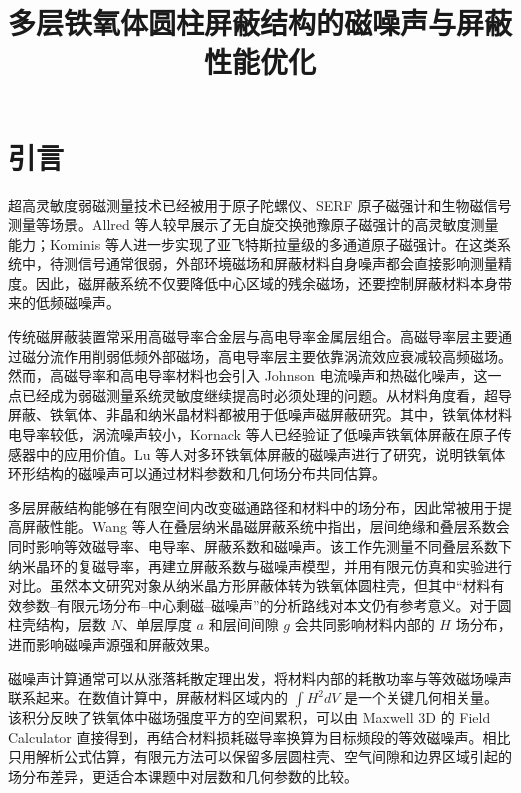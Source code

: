 \documentclass[UTF8,a4paper,12pt]{ctexart}
\title{多层铁氧体圆柱屏蔽结构的磁噪声与屏蔽性能优化}
\author{}
\date{}
\begin{document}
\maketitle

\section{引言}

超高灵敏度弱磁测量技术已经被用于原子陀螺仪、SERF 原子磁强计和生物磁信号测量等场景。Allred 等人较早展示了无自旋交换弛豫原子磁强计的高灵敏度测量能力\cite{Allred2002SERF}；Kominis 等人进一步实现了亚飞特斯拉量级的多通道原子磁强计\cite{Kominis2003Subfemtotesla}。在这类系统中，待测信号通常很弱，外部环境磁场和屏蔽材料自身噪声都会直接影响测量精度。因此，磁屏蔽系统不仅要降低中心区域的残余磁场，还要控制屏蔽材料本身带来的低频磁噪声。

传统磁屏蔽装置常采用高磁导率合金层与高电导率金属层组合。高磁导率层主要通过磁分流作用削弱低频外部磁场，高电导率层主要依靠涡流效应衰减较高频磁场。然而，高磁导率和高电导率材料也会引入 Johnson 电流噪声和热磁化噪声，这一点已经成为弱磁测量系统灵敏度继续提高时必须处理的问题\cite{LeeRomalis2008Noise,Wang2024Nanocrystalline}。从材料角度看，超导屏蔽、铁氧体、非晶和纳米晶材料都被用于低噪声磁屏蔽研究。其中，铁氧体材料电导率较低，涡流噪声较小，Kornack 等人已经验证了低噪声铁氧体屏蔽在原子传感器中的应用价值\cite{Kornack2007Ferrite}。Lu 等人对多环铁氧体屏蔽的磁噪声进行了研究，说明铁氧体环形结构的磁噪声可以通过材料参数和几何场分布共同估算\cite{Lu2020FerriteNoise}。

多层屏蔽结构能够在有限空间内改变磁通路径和材料中的场分布，因此常被用于提高屏蔽性能。Wang 等人在叠层纳米晶磁屏蔽系统中指出，层间绝缘和叠层系数会同时影响等效磁导率、电导率、屏蔽系数和磁噪声\cite{Wang2024Nanocrystalline}。该工作先测量不同叠层系数下纳米晶环的复磁导率，再建立屏蔽系数与磁噪声模型，并用有限元仿真和实验进行对比。虽然本文研究对象从纳米晶方形屏蔽体转为铁氧体圆柱壳，但其中“材料有效参数--有限元场分布--中心剩磁--磁噪声”的分析路线对本文仍有参考意义。对于圆柱壳结构，层数 \(N\)、单层厚度 \(a\) 和层间间隙 \(g\) 会共同影响材料内部的 \(H\) 场分布，进而影响磁噪声源强和屏蔽效果。

磁噪声计算通常可以从涨落耗散定理出发，将材料内部的耗散功率与等效磁场噪声联系起来\cite{Kubo1966FDT,LeeRomalis2008Noise}。在数值计算中，屏蔽材料区域内的
\(\int H^2 dV\)
是一个关键几何相关量。该积分反映了铁氧体中磁场强度平方的空间累积，可以由 Maxwell 3D 的 Field Calculator 直接得到，再结合材料损耗磁导率换算为目标频段的等效磁噪声。相比只用解析公式估算，有限元方法可以保留多层圆柱壳、空气间隙和边界区域引起的场分布差异，更适合本课题中对层数和几何参数的比较。
\end{document}
